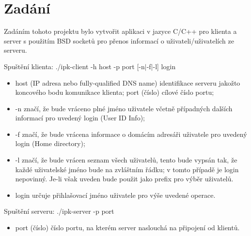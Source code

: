 \documentclass[11pt]{article}
\begin{document}
	\section{Zadání}
	\begin{flushleft}
		Zadáním tohoto projektu bylo vytvořit aplikaci v jazyce C/C++ pro klienta a server s použitím BSD socketů pro přenos informací o uživateli/uživatelích ze serveru. \par		
		
		\begin{center}
			Spuštění klienta: ./ipk-client -h host -p port [-n$\mid$-f$\mid$-l] login\\[0.5 cm]
			\begin{itemize}
				\item host (IP adresa nebo fully-qualified DNS name) identifikace serveru jakožto koncového bodu komunikace klienta;
				port (číslo) cílové číslo portu;
				\item -n značí, že bude vráceno plné jméno uživatele včetně případných dalších informací pro uvedený login (User ID Info);
				\item -f značí, že bude vrácena informace o domácím adresáři uživatele pro uvedený login (Home directory);
				\item -l značí, že bude vrácen seznam všech uživatelů, tento bude vypsán tak, že každé uživatelské jméno bude na zvláštním řádku; v tomto případě je login nepovinný. Je-li však uveden bude použit jako prefix pro výběr uživatelů.
				\item login určuje přihlašovací jméno uživatele pro výše uvedené operace.
			\end{itemize}
		\end{center}
		\begin{center}
			Spuštění serveru: ./ipk-server -p port  \\[0.5 cm]
			\begin{itemize}
				\item port (číslo) číslo portu, na kterém server naslouchá na připojení od klientů.
			\end{itemize}
		\end{center}
			
	\end{flushleft}
	
\end{document}
